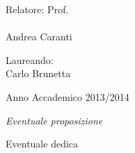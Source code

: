 \documentclass[a4paper,10pt, openright]{book}%
\theoremstyle{plain}%
\theoremstyle{definition}
\theoremstyle{remark}
\begin{document}
\begin{titlepage}
\begin{center}
\begin{minipage}[t]{0.47\textwidth}
{\large{\sc Relatore: Prof.}\\
{ \\ Andrea Caranti}}\\
\end{minipage}
\hfill
\begin{minipage}[t]{0.47\textwidth}\raggedleft
{\large{\sc Laureando:}\\ 
\vspace{5mm} 
{ Carlo Brunetta}}
\end{minipage}
\vspace{20mm}
\begin{center}
{\large{\sc Anno Accademico 2013/2014}}
\end{center}
\end{center}
\end{titlepage}

\thispagestyle{empty}

\newpage
\thispagestyle{empty}
\begin{flushleft}
\textit{Eventuale proposizione}\\
\end{flushleft}
\vspace*{3cm}
\begin{flushright}
Eventuale dedica
\end{flushright}

\newpage
\tableofcontents
\newpage
\mainmatter













\end{document}
